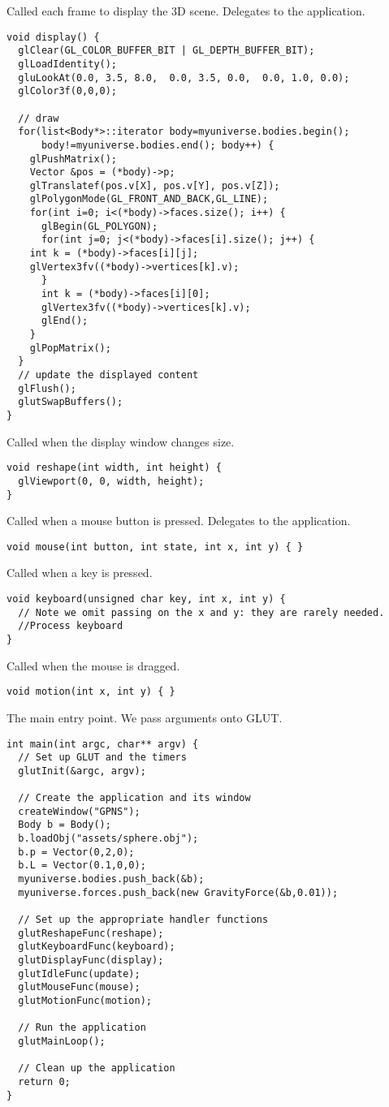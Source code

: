 Called each frame to display the 3D scene. Delegates to
the application.
\begin{lstlisting}
void display() {
  glClear(GL_COLOR_BUFFER_BIT | GL_DEPTH_BUFFER_BIT);
  glLoadIdentity();
  gluLookAt(0.0, 3.5, 8.0,  0.0, 3.5, 0.0,  0.0, 1.0, 0.0);
  glColor3f(0,0,0);
  
  // draw
  for(list<Body*>::iterator body=myuniverse.bodies.begin();
      body!=myuniverse.bodies.end(); body++) {
    glPushMatrix();
    Vector &pos = (*body)->p;
    glTranslatef(pos.v[X], pos.v[Y], pos.v[Z]);
    glPolygonMode(GL_FRONT_AND_BACK,GL_LINE);
    for(int i=0; i<(*body)->faces.size(); i++) {      
      glBegin(GL_POLYGON);
      for(int j=0; j<(*body)->faces[i].size(); j++) {
	int k = (*body)->faces[i][j]; 
	glVertex3fv((*body)->vertices[k].v);
      }
      int k = (*body)->faces[i][0]; 
      glVertex3fv((*body)->vertices[k].v);
      glEnd();
    }
    glPopMatrix();
  }
  // update the displayed content
  glFlush();
  glutSwapBuffers();
}
\end{lstlisting}

Called when the display window changes size.
\begin{lstlisting}
void reshape(int width, int height) {
  glViewport(0, 0, width, height);
}
\end{lstlisting}

Called when a mouse button is pressed. Delegates to the
application.
\begin{lstlisting}
void mouse(int button, int state, int x, int y) { }
\end{lstlisting}

Called when a key is pressed.
\begin{lstlisting}
void keyboard(unsigned char key, int x, int y) {
  // Note we omit passing on the x and y: they are rarely needed.
  //Process keyboard
}
\end{lstlisting}

Called when the mouse is dragged.
\begin{lstlisting}
void motion(int x, int y) { }
\end{lstlisting}

The main entry point. We pass arguments onto GLUT.
\begin{lstlisting}
int main(int argc, char** argv) {
  // Set up GLUT and the timers
  glutInit(&argc, argv);
  
  // Create the application and its window
  createWindow("GPNS");
  Body b = Body();
  b.loadObj("assets/sphere.obj");
  b.p = Vector(0,2,0);
  b.L = Vector(0.1,0,0);
  myuniverse.bodies.push_back(&b);
  myuniverse.forces.push_back(new GravityForce(&b,0.01));

  // Set up the appropriate handler functions
  glutReshapeFunc(reshape);
  glutKeyboardFunc(keyboard);
  glutDisplayFunc(display);
  glutIdleFunc(update);
  glutMouseFunc(mouse);
  glutMotionFunc(motion);
  
  // Run the application
  glutMainLoop();
  
  // Clean up the application
  return 0;
}
\end{lstlisting}
